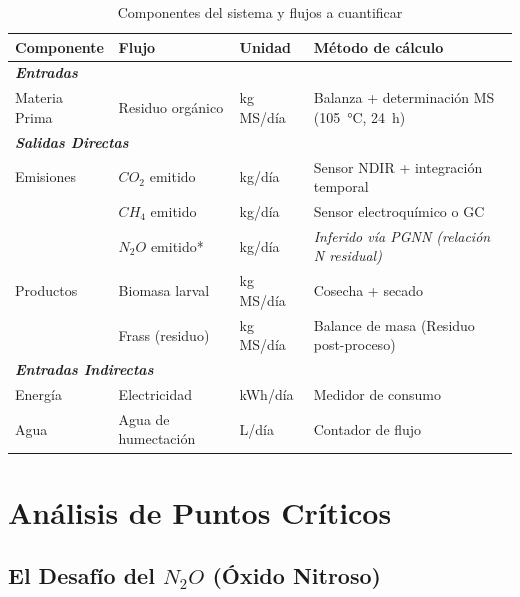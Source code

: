 \documentclass[12pt]{article}
\begin{document}
\begin{table}[H]
\centering
\small
\caption{Componentes del sistema y flujos a cuantificar}
\label{tab:componentes_sistema}
\begin{tabularx}{\textwidth}{@{} l l l X @{}}
\toprule
\textbf{Componente} & \textbf{Flujo} & \textbf{Unidad} & \textbf{Método de cálculo} \\
\midrule
\multicolumn{4}{l}{\textit{\textbf{Entradas}}} \\
Materia Prima & Residuo orgánico & kg MS/día & Balanza + determinación MS (\SI{105}{\celsius}, \SI{24}{\hour}) \\
\midrule
\multicolumn{4}{l}{\textit{\textbf{Salidas Directas}}} \\
Emisiones & $CO_{2}$ emitido & kg/día & Sensor NDIR + integración temporal \\
          & $CH_{4}$ emitido & kg/día & Sensor electroquímico o GC \\
          & $N_{2}O$ emitido* & kg/día & \textit{Inferido vía PGNN (relación N residual)} \\
Productos & Biomasa larval & kg MS/día & Cosecha + secado \\
          & Frass (residuo) & kg MS/día & Balance de masa (Residuo post-proceso) \\
\midrule
\multicolumn{4}{l}{\textit{\textbf{Entradas Indirectas}}} \\
Energía & Electricidad & kWh/día & Medidor de consumo \\
Agua & Agua de humectación & L/día & Contador de flujo \\
\bottomrule
\end{tabularx}
\end{table}

\section{Análisis de Puntos Críticos}

\subsection{El Desafío del $N_2O$ (Óxido Nitroso)}
\end{document}
